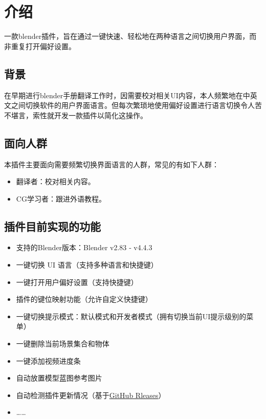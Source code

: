 \documentclass{../../public_resources/doc}
\begin{document}
\maketitle
\frontmatter
{}
{}
\mainmatter

\chapter{介绍}
一款blender插件，旨在通过一键快速、轻松地在两种语言之间切换用户界面，而非重复打开偏好设置。


\section{背景}
在早期进行blender手册翻译工作时，因需要校对相关UI内容，本人频繁地在中英文之间切换软件的用户界面语言。但每次繁琐地使用偏好设置进行语言切换令人苦不堪言，索性就开发一款插件以简化这操作。

\section{面向人群}
\noindent 本插件主要面向需要频繁切换界面语言的人群，常见的有如下人群：
\begin{itemize}
    \item 翻译者：校对相关内容。
    \item CG学习者：跟进外语教程。
\end{itemize}

\section{插件目前实现的功能}
\begin{itemize}
    \item 支持的Blender版本：Blender v2.83 ‑ v4.4.3
    \item 一键切换 UI 语言（支持多种语言和快捷键）
    \item 一键打开用户偏好设置（支持快捷键）
    \item 插件的键位映射功能（允许自定义快捷键）
    \item 一键切换提示模式：默认模式和开发者模式（拥有切换当前UI提示级别的菜单）
    \item 一键删除当前场景集合和物体
    \item 一键添加视频进度条
    \item 自动放置模型蓝图参考图片
    \item 自动检测插件更新情况（基于\href{https://github.com/Mister-Kin/ToggleLanguage/releases}{GitHub Rleases}）
    \item ……
\end{itemize}
\end{document}
